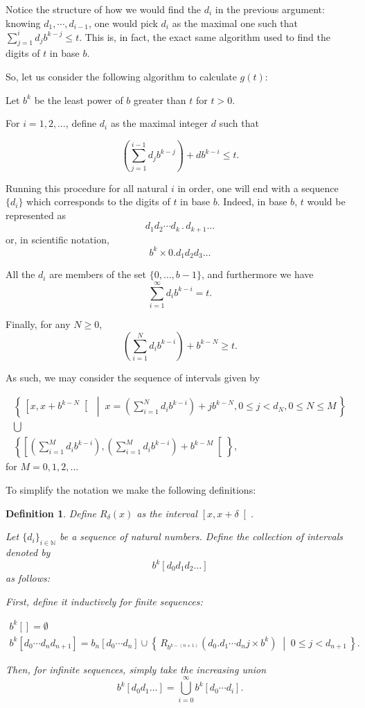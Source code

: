 \documentclass[11pt, reqno]{amsart}
\newcommand{\N}{\mathbb{N}}
\newtheorem{definition}{Definition}
\begin{document}
\bigskip

Notice the structure of how we would find the $d_i$ in the previous argument: knowing $d_1, \cdots, d_{i-1}$, one would pick $d_i$ as the maximal one such that $\sum_{j = 1}^i d_j b^{k-j} \leq t$. This is, in fact, the exact same algorithm used to find the digits of $t$ in base $b$.

So, let us consider the following algorithm to calculate $g(t)$:

Let $b^k$ be the least power of $b$ greater than $t$ for $t > 0$.

For $i = 1, 2, \dots$, define  $d_i$ as the maximal integer $d$ such that

\[ \left( \sum_{j = 1}^{i-1} d_j b^{k-j} \right) + d b^{k-i} \leq t.\]
\label{digalg}

Running this procedure for all natural $i$ in order, one will end with a sequence $\{d_i\}$ which corresponds to the digits of $t$ in base $b$. Indeed, in base $b$, $t$ would be represented as
\[d_1 d_2 \cdots d_k \, . \, d_{k+1} \ldots\]
or, in scientific notation,
\[b^k \times 0.d_1 d_2 d_3 \dots \]

All the $d_i$ are members of the set $\{ 0, \dots, b-1\}$, and furthermore we have
\[\sum_{i = 1}^\infty d_i b^{k-i} = t.\]

Finally, for any $N \geq 0$,
\[(\sum_{i=1}^N d_i b^{k-i}) + b^{k-N} \geq t.\]

As such, we may consider the sequence of intervals given by

\begin{gather*}
\left\{\, \left[ x , x + b^{k-N} \right[ \;\middle|\; x = \left(\sum_{i=1}^N d_i b^{k-i}\right) + j b^{k-N}, 0 \leq j < d_N, 0 \leq N \leq M\,\right\}\\
\bigcup\\
\left\{\left[ \left(\sum_{i=1}^M d_i b^{k-i}\right) ,\left(\sum_{i=1}^M d_i b^{k-i}\right) + b^{k-M} \right[\right\},
\end{gather*}
for $M = 0, 1, 2, \dots$

To simplify the notation we make the following definitions:

\begin{definition}
Define $R_\delta(x)$ as the interval  $\left[x, x+\delta \right[$.

Let $\{d_i\}_{i \in \N}$ be a sequence of natural numbers. Define the collection of intervals denoted by
\[ b^k [d_0 d_1 d_2 \dots] \]
as follows:

First, define it inductively for finite sequences:

\begin{gather*}
b^k [] = \emptyset\\
b^k [d_0 \cdots d_n d_{n+1}] = b_n [d_0 \cdots d_n] \cup \left\{\, R_{b^{k-(n+1)}}(d_0 . d_1 \cdots d_n j \times b^k) \;\middle|\; 0 \leq j < d_{n+1} \,\right\}.
\end{gather*}

Then, for infinite sequences, simply take the increasing union
\[ b^k[d_0 d_1 \dots] = \bigcup_{i = 0}^\infty b^k[d_0 \cdots d_i].\]

\end{definition}
\end{document}
